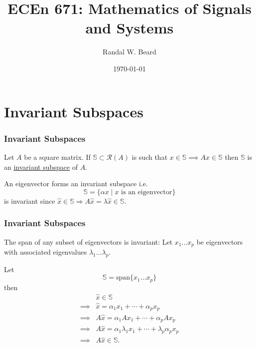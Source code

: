 \documentclass{beamer}
\title{ECEn 671: Mathematics of Signals and Systems}
\author{Randal W. Beard}
\institute{Brigham Young University}
\date{\today}
\begin{document}
\begin{frame}
	\titlepage
\end{frame}



\section{Invariant Subspaces}
\frame{\sectionpage}

\begin{frame}\frametitle{Invariant Subspaces}
	\begin{definition}
		Let $A$ be a square matrix.  
		If $\mathbb{S} \subset \mathcal{R}(A)$ is such that $x \in \mathbb{S} \implies Ax \in \mathbb{S}$ then $\mathbb{S}$ is an \underline{invariant subspace} of $A$.
	\end{definition}
	
	\begin{example}
		An eigenvector forms an invariant subspace i.e. 
		\[
			\mathbb{S} = \{\alpha x \mid x \text{~is an eigenvector}\}
		\]
		is invariant since $\hat{x} \in \mathbb{S} \Rightarrow A\hat{x} = \lambda\hat{x} \in \mathbb{S}$.		
		\end{example}
\end{frame}

\begin{frame}\frametitle{Invariant Subspaces}
	\begin{example}
		The span of any subset of eigenvectors is invariant:  Let $x_1 \ldots x_p$ be eigenvectors with associated eigenvalues $\lambda_1 \ldots \lambda_p$.
		
		Let 
		\[
			\mathbb{S} = \text{span}\{x_1 \ldots x_p\}
		\]
		then
		\begin{align*}
			& \hat{x} \in \mathbb{S} \\
			\implies & \hat{x} = \alpha_1 x_1 + \cdots + \alpha_p x_p \\
			\implies & A\hat{x} = \alpha_1Ax_1 + \cdots + \alpha_pAx_p \\
			\implies & A\hat{x} = \alpha_1\lambda_1x_1 + \cdots + \lambda_p\alpha_px_p \\
			\implies & A\hat{x} \in \mathbb{S}.		
		\end{align*}
	\end{example}
\end{frame}
\end{document}
